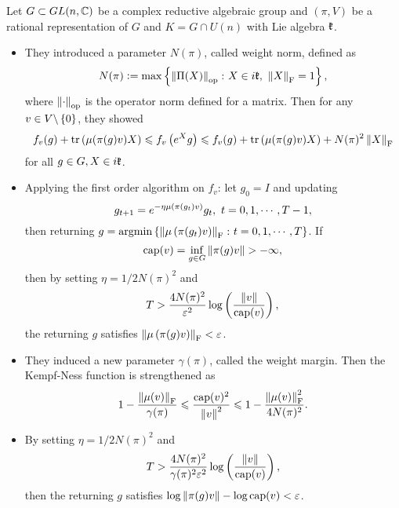 \documentclass[suri,pdfbookmark]{engsuribt} %
\begin{document}
  Let $G \subset GL(n,\mathbb{C})$ be a complex reductive algebraic group and $(\pi,V)$ be a rational representation of $G$ and $K = G \cap U(n)$ with Lie algebra $\mathfrak{k}$.
  \begin{itemize}
    \item They introduced a parameter $N(\pi)$, called weight norm, defined as
    \begin{equation*}
      N(\pi) \vcentcolon= \max\left\{\left\lVert\Pi(X)\right\lVert_{\operatorname{op}} \colon X \in i\mathfrak{k},~\left\lVert X\right\lVert_{\operatorname{F}} = 1\right\},
    \end{equation*}
    where $\left\lVert\cdot\right\lVert_{\operatorname{op}}$ is the operator norm defined for a matrix. Then for any $v \in V \backslash \left\{0\right\}$, they showed
    \begin{equation} \label{in:1}
      f_v(g) + \operatorname{tr}\left(\mu(\pi(g)v)X\right) \leqslant f_v\left(e^{X}g\right) \leqslant f_v(g) + \operatorname{tr}\left(\mu(\pi(g)v)X\right) + N(\pi)^2\left\lVert X\right\lVert_{\operatorname{F}}
    \end{equation}
    for all $g \in G,X \in i\mathfrak{k}$.

    \item Applying the first order algorithm on $f_v$: let $g_0 = I$ and updating
    \begin{equation*}
      g_{t+1} = e^{-\eta \mu\left(\pi(g_t)v\right)}g_t,~t = 0,1,\cdots,T-1,
    \end{equation*}
    then returning $g = \operatorname{argmin} \left\{\left\lVert\mu\left(\pi(g_t)v\right)\right\lVert_{\operatorname{F}} \colon t = 0,1,\cdots,T\right\}$. If 
    \begin{equation*}
      \operatorname{cap}(v) = \inf_{g \in G} \left\lVert\pi(g)v\right\lVert > -\infty,
    \end{equation*}
    then by setting $\eta = 1 / 2N(\pi)^2$ and 
    \begin{equation*}
      T > \frac{4N(\pi)^2}{\varepsilon^2}\log\left(\frac{\left\lVert v\right\lVert}{\operatorname{cap}(v)}\right),
    \end{equation*}
    the returning $g$ satisfies $\left\lVert\mu\left(\pi(g)v\right)\right\lVert_{\operatorname{F}} < \varepsilon$.

    \item They induced a new parameter $\gamma(\pi)$, called the weight margin. Then the Kempf-Ness function is strengthened as
    \begin{equation}\label{in:2}
      1-\frac{\left\lVert\mu(v)\right\lVert_{\operatorname{F}}}{\gamma(\pi)} \leqslant \frac{\operatorname{cap}(v)^2}{\left\lVert v\right\lVert^2} \leqslant 1-\frac{\left\lVert\mu(v)\right\lVert_{\operatorname{F}}^2}{4N(\pi)^2}.
    \end{equation}

    \item By setting $\eta = 1 / 2N(\pi)^2$ and 
    \begin{equation*}
      T > \frac{4N(\pi)^2}{\gamma(\pi)^2\varepsilon^2}\log\left(\frac{\left\lVert v\right\lVert}{\operatorname{cap}(v)}\right),
    \end{equation*}
    then the returning $g$ satisfies $\log \left\lVert\pi(g)v\right\lVert - \log \operatorname{cap}(v) < \varepsilon$.
  \end{itemize}
\end{document}
